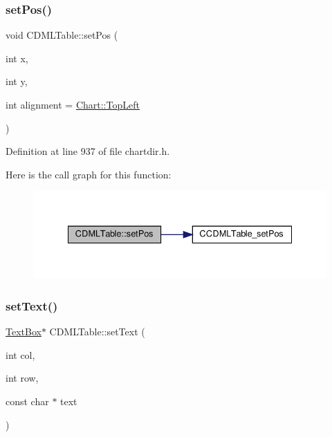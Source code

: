 \subsubsection{\texorpdfstring{set\+Pos()}{setPos()}}
{\footnotesize\ttfamily void C\+D\+M\+L\+Table\+::set\+Pos (\begin{DoxyParamCaption}\item[{int}]{x,  }\item[{int}]{y,  }\item[{int}]{alignment = {\ttfamily \hyperlink{namespace_chart_ae222e51ce11a254450b6ddfbc862680aa0bf92d1d2d6713aa62e92b86b9a8532f}{Chart\+::\+Top\+Left}} }\end{DoxyParamCaption})\hspace{0.3cm}{\ttfamily [inline]}}



Definition at line 937 of file chartdir.\+h.

Here is the call graph for this function\+:
\nopagebreak
\begin{figure}[H]
\begin{center}
\leavevmode
\includegraphics[width=335pt]{class_c_d_m_l_table_ae3601809a2a92183ceb02a33644cfd89_cgraph}
\end{center}
\end{figure}
\mbox{\label{class_c_d_m_l_table_afc130341376816bb3a668f8cb3124cad}} 
\subsubsection{\texorpdfstring{set\+Text()}{setText()}}
{\footnotesize\ttfamily \hyperlink{class_text_box}{Text\+Box}$\ast$ C\+D\+M\+L\+Table\+::set\+Text (\begin{DoxyParamCaption}\item[{int}]{col,  }\item[{int}]{row,  }\item[{const char $\ast$}]{text }\end{DoxyParamCaption})\hspace{0.3cm}{\ttfamily [inline]}}



